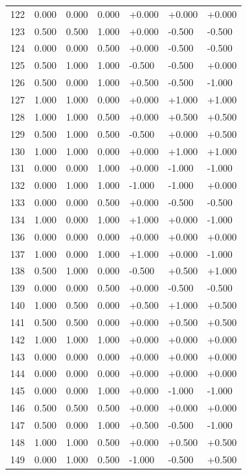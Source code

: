 \documentclass[11pt]{article}
\begin{document}
{\begin{longtable}[]{@{}lllllll@{}}
122 & 0.000 & 0.000 & 0.000 & +0.000 & +0.000 & +0.000 \\
123 & 0.500 & 0.500 & 1.000 & +0.000 & -0.500 & -0.500 \\
124 & 0.000 & 0.000 & 0.500 & +0.000 & -0.500 & -0.500 \\
125 & 0.500 & 1.000 & 1.000 & -0.500 & -0.500 & +0.000 \\
126 & 0.500 & 0.000 & 1.000 & +0.500 & -0.500 & -1.000 \\
127 & 1.000 & 1.000 & 0.000 & +0.000 & +1.000 & +1.000 \\
128 & 1.000 & 1.000 & 0.500 & +0.000 & +0.500 & +0.500 \\
129 & 0.500 & 1.000 & 0.500 & -0.500 & +0.000 & +0.500 \\
130 & 1.000 & 1.000 & 0.000 & +0.000 & +1.000 & +1.000 \\
131 & 0.000 & 0.000 & 1.000 & +0.000 & -1.000 & -1.000 \\
132 & 0.000 & 1.000 & 1.000 & -1.000 & -1.000 & +0.000 \\
133 & 0.000 & 0.000 & 0.500 & +0.000 & -0.500 & -0.500 \\
134 & 1.000 & 0.000 & 1.000 & +1.000 & +0.000 & -1.000 \\
136 & 0.000 & 0.000 & 0.000 & +0.000 & +0.000 & +0.000 \\
137 & 1.000 & 0.000 & 1.000 & +1.000 & +0.000 & -1.000 \\
138 & 0.500 & 1.000 & 0.000 & -0.500 & +0.500 & +1.000 \\
139 & 0.000 & 0.000 & 0.500 & +0.000 & -0.500 & -0.500 \\
140 & 1.000 & 0.500 & 0.000 & +0.500 & +1.000 & +0.500 \\
141 & 0.500 & 0.500 & 0.000 & +0.000 & +0.500 & +0.500 \\
142 & 1.000 & 1.000 & 1.000 & +0.000 & +0.000 & +0.000 \\
143 & 0.000 & 0.000 & 0.000 & +0.000 & +0.000 & +0.000 \\
144 & 0.000 & 0.000 & 0.000 & +0.000 & +0.000 & +0.000 \\
145 & 0.000 & 0.000 & 1.000 & +0.000 & -1.000 & -1.000 \\
146 & 0.500 & 0.500 & 0.500 & +0.000 & +0.000 & +0.000 \\
147 & 0.500 & 0.000 & 1.000 & +0.500 & -0.500 & -1.000 \\
148 & 1.000 & 1.000 & 0.500 & +0.000 & +0.500 & +0.500 \\
149 & 0.000 & 1.000 & 0.500 & -1.000 & -0.500 & +0.500 \\

\end{longtable}}
\end{document}
